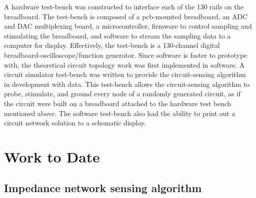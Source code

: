\documentclass[11pt, a4paper]{article}
\begin{document}
A hardware test-bench was constructed to interface each of the 130 rails on the breadboard. 
The test-bench is composed of a pcb-mounted breadboard, an ADC and DAC multiplexing board, a microcontroller, firmware to control sampling and stimulating the breadboard, and software to stream the sampling data to a computer for display.
Effectively, the test-bench is a 130-channel digital breadboard-oscilloscope/function generator. 
Since software is faster to prototype with, the theoretical circuit topology work was first implemented in software. 
A circuit simulator test-bench was written to provide the circuit-sensing algorithm in development with data.
This test-bench allows the circuit-sensing algorithm to probe, stimulate, and ground every node of a randomly generated circuit, as if the circuit were built on a breadboard attached to the hardware test bench mentioned above.
The software test-bench also had the ability to print out a circuit network solution to a schematic display.

\section{Work to Date}

\subsection{Impedance network sensing algorithm}
\end{document}
